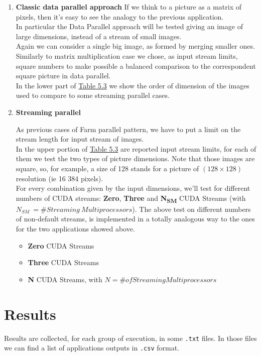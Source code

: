 \begin{enumerate}
	\item \textbf{Classic data parallel approach}
	If we think to a picture as a matrix of pixels, then it's easy to see the analogy to the previous application.\\
	In particular the Data Parallel approach will be tested giving an image of large dimensions, instead of a stream of small images.\\
	Again we can consider a single big image, as formed by merging smaller ones. Similarly to matrix multiplication case we chose, as input stream limits, square numbers to make possible a balanced comparison to the correspondent square picture in data parallel.\\
	In the lower part of \hyperref[tab:imgdata]{Table 5.3} we show the order of dimension of the images used to compare to some streaming parallel cases.
	
	\item \textbf{Streaming parallel}
	
	As previous cases of Farm parallel pattern, we have to put a limit on the stream length for input stream of images.\\
	In the upper portion of \hyperref[tab:imgdata]{Table 5.3} are reported input stream limits, for each of them we test the two types of picture dimensions. Note that those images are square, so, for example, a size of 128 stands for a picture of \((128\times128)\) resolution (ie 16 384 pixels).\\
	For every combination given by the input dimensions, we'll test for different numbers of CUDA streams: \textbf{Zero}, \textbf{Three} and \textbf{N\textsubscript{SM}} CUDA Streams (with \(N_{SM} \ =\# Streaming \ Multiprocessors\)).
	The above test on different numbers of non-default streams, is implemented in a totally analogous way to the ones for the two applications showed above.
	
	\begin{itemize}
		\item \textbf{Zero} CUDA Streams
		\item \textbf{Three} CUDA Streams
		\item \textbf{N} CUDA Streams, with \(N=\# of Streaming Multiprocessors\)
	\end{itemize}
\end{enumerate}

\section{Results}
Results are collected, for each group of execution, in some \texttt{.txt} files. In those files we can find a list of applications outputs in \texttt{.csv} format.

